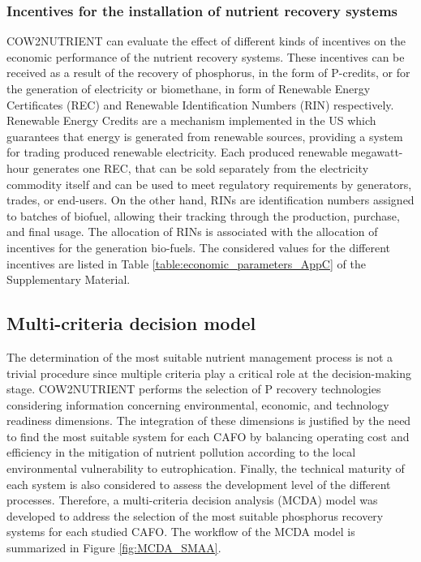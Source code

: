 \begin{refsection}[referencesCh4]
\subsubsection{Incentives for the installation of nutrient recovery systems}
COW2NUTRIENT can evaluate the effect of different kinds of incentives on the economic performance of the nutrient recovery systems. These incentives can be received as a result of the recovery of phosphorus, in the form of P-credits, or for the generation of electricity or biomethane, in form of Renewable Energy Certificates (REC) and Renewable Identification Numbers (RIN) respectively. Renewable Energy Credits are a mechanism implemented in the US which guarantees that energy is generated from renewable sources, providing a system for trading produced renewable electricity. Each produced renewable megawatt-hour generates one REC, that can be sold separately from the electricity commodity itself and can be used to meet regulatory requirements by generators, trades, or end-users. On the other hand, RINs are identification numbers assigned to batches of biofuel, allowing their tracking through the production, purchase, and final usage. The allocation of RINs is associated with the allocation of incentives for the generation bio-fuels. 
The considered values for the different incentives are listed in Table \ref{table:economic_parameters_AppC} of the Supplementary Material.

\subsection{Multi-criteria decision model}
The determination of the most suitable nutrient management process is not a trivial procedure since multiple criteria play a critical role at the decision-making stage. COW2NUTRIENT performs the selection of P recovery technologies considering information concerning environmental, economic, and technology readiness dimensions. The integration of these dimensions is justified by the need to find the most suitable system for each CAFO by balancing operating cost and efficiency in the mitigation of nutrient pollution according to the local environmental vulnerability to eutrophication. Finally, the technical maturity of each system is also considered to assess the development level of the different processes. Therefore, a multi-criteria decision analysis (MCDA) model was developed to address the selection of the most suitable phosphorus recovery systems for each studied CAFO. The workflow of the MCDA model is summarized in Figure \ref{fig:MCDA_SMAA}.


\end{refsection}
